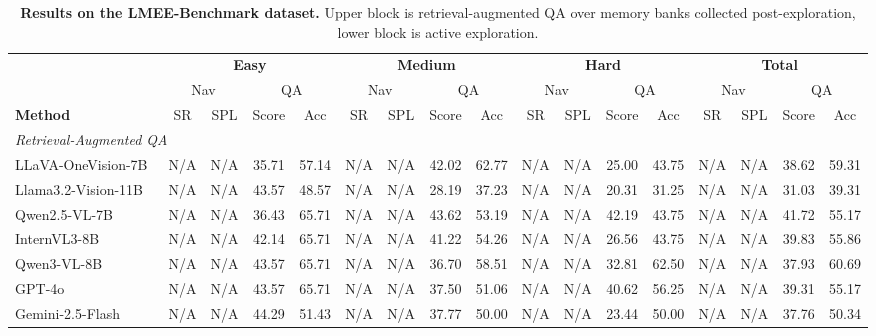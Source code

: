 \begin{table}[htbp]
\centering
\caption{\textbf{Results on the LMEE-Benchmark dataset.} Upper block is retrieval-augmented QA over memory banks collected post-exploration, lower block is active exploration.}
\label{tab:lmee}
\footnotesize
\setlength{\tabcolsep}{3pt}
\begin{tabular}{l|cccc|cccc|cccc|cccc}
\toprule
& \multicolumn{4}{|c}{\textbf{Easy}} & \multicolumn{4}{|c}{\textbf{Medium}} & \multicolumn{4}{|c}{\textbf{Hard}} & \multicolumn{4}{|c}{\textbf{Total}} \\
\cmidrule(lr){2-5} \cmidrule(lr){6-9} \cmidrule(lr){10-13} \cmidrule(lr){14-17}
& \multicolumn{2}{c}{Nav} & \multicolumn{2}{c|}{QA} & \multicolumn{2}{c}{Nav} & \multicolumn{2}{c|}{QA} & \multicolumn{2}{c}{Nav} & \multicolumn{2}{c|}{QA} & \multicolumn{2}{c}{Nav} & \multicolumn{2}{c}{QA} \\
\cmidrule(lr){2-3} \cmidrule(lr){4-5} \cmidrule(lr){6-7} \cmidrule(lr){8-9} \cmidrule(lr){10-11} \cmidrule(lr){12-13} \cmidrule(lr){14-15} \cmidrule(lr){16-17}
\textbf{Method} & SR & SPL & Score & Acc & SR & SPL & Score & Acc & SR & SPL & Score & Acc & SR & SPL & Score & Acc \\
\midrule
\multicolumn{17}{l}{\emph{Retrieval-Augmented QA}} \\
LLaVA-OneVision-7B~\cite{li2024llavaov} & N/A & N/A & 35.71 & 57.14 & N/A & N/A & 42.02 & 62.77 & N/A & N/A & 25.00 & 43.75 & N/A & N/A & 38.62 & 59.31 \\
Llama3.2-Vision-11B & N/A & N/A & 43.57 & 48.57 & N/A & N/A & 28.19 & 37.23 & N/A & N/A & 20.31 & 31.25 & N/A & N/A & 31.03 & 39.31 \\
Qwen2.5-VL-7B~\cite{bai2025qwen25vl} & N/A & N/A & 36.43 & 65.71 & N/A & N/A & 43.62 & 53.19 & N/A & N/A & 42.19 & 43.75 & N/A & N/A & 41.72 & 55.17 \\
InternVL3-8B & N/A & N/A & 42.14 & 65.71 & N/A & N/A & 41.22 & 54.26 & N/A & N/A & 26.56 & 43.75 & N/A & N/A & 39.83 & 55.86 \\
Qwen3-VL-8B~\cite{bai2025qwen3} & N/A & N/A & 43.57 & 65.71 & N/A & N/A & 36.70 & 58.51 & N/A & N/A & 32.81 & 62.50 & N/A & N/A & 37.93 & 60.69 \\
GPT-4o~\cite{openai2024gpt4o} & N/A & N/A & 43.57 & 65.71 & N/A & N/A & 37.50 & 51.06 & N/A & N/A & 40.62 & 56.25 & N/A & N/A & 39.31 & 55.17 \\
Gemini-2.5-Flash & N/A & N/A & 44.29 & 51.43 & N/A & N/A & 37.77 & 50.00 & N/A & N/A & 23.44 & 50.00 & N/A & N/A & 37.76 & 50.34 \\

\end{tabular}
\end{table}

